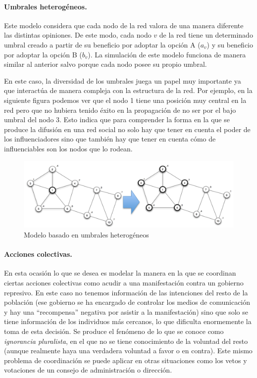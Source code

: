 \documentclass[]{article}
\begin{document}
\paragraph*{Umbrales heterogéneos.}\label{umbrales-heteroguxe9neos.}

Este modelo considera que cada nodo de la red valora de una manera
diferente las distintas opiniones. De este modo, cada nodo \(v\) de la
red tiene un determinado umbral creado a partir de su beneficio por
adoptar la opción A (\(a_v\)) y su beneficio por adoptar la opción B
(\(b_v\)). La simulación de este modelo funciona de manera similar al
anterior salvo porque cada nodo posee su propio umbral.

En este caso, la diversidad de los umbrales juega un papel muy
importante ya que interactúa de manera compleja con la estructura de la
red. Por ejemplo, en la siguiente figura podemos ver que el nodo 1 tiene
una posición muy central en la red pero que no hubiera tenido éxito en
la propagación de no ser por el bajo umbral del nodo 3. Esto indica que
para comprender la forma en la que se produce la difusión en una red
social no solo hay que tener en cuenta el poder de los influenciadores
sino que también hay que tener en cuenta cómo de influenciables son los
nodos que lo rodean.

\begin{figure}[htbp]
\centering
\includegraphics{../images/tema08/umbralHeterogeneo.png}
\caption{Modelo basado en umbrales heterogéneos}
\end{figure}

\paragraph*{Acciones colectivas.}\label{acciones-colectivas.}

En esta ocasión lo que se desea es modelar la manera en la que se
coordinan ciertas acciones colectivas como acudir a una manifestación
contra un gobierno represivo. En este caso no tenemos información de las
intenciones del resto de la población (ese gobierno se ha encargado de
controlar los medios de comunicación y hay una ``recompensa'' negativa
por asistir a la manifestación) sino que solo se tiene información de
los individuos más cercanos, lo que dificulta enormemente la toma de
esta decisión. Se produce el fenómeno de lo que se conoce como
\emph{ignorancia pluralista}, en el que no se tiene conocimiento de la
voluntad del resto (aunque realmente haya una verdadera voluntad a favor
o en contra). Este mismo problema de coordinación se puede aplicar en
otras situaciones como los vetos y votaciones de un consejo de
administración o dirección.
\end{document}
